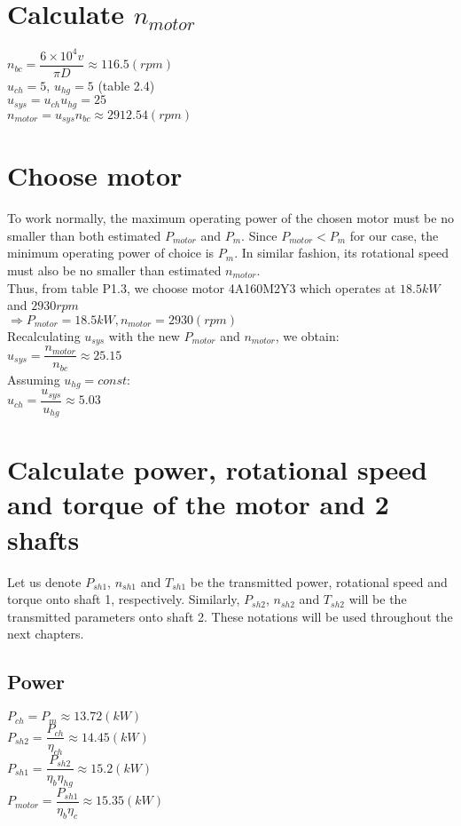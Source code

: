 \section{Calculate $ n_{motor} $}
$ n_{bc} = \dfrac{6\times10^4v}{\pi D} \approx 116.5 \unit{(rpm)}$\\
$ u_{ch} = 5$, $ u_{hg} = 5$ (table 2.4)\\
$ u_{sys} = u_{ch}u_{hg} = 25 $\\
$ n_{motor} = u_{sys}n_{bc} \approx 2912.54  \unit{(rpm)} $

\section{Choose motor}
To work normally, the maximum operating power of the chosen motor must be no smaller than both estimated $ P_{motor} $ and $ P_m $. Since $ P_{motor} < P_m $ for our case, the minimum operating power of choice is $ P_m $. In similar fashion, its rotational speed must also be no smaller than estimated $ n_{motor} $.\\
Thus, from table P1.3, we choose motor 4A160M2Y3 which operates at $ 18.5\unit{kW} $ and $ 2930\unit{rpm} $\\
$\Rightarrow P_{motor} = 18.5\unit{kW}, n_{motor} = 2930\unit{(rpm)}$\\
Recalculating $ u_{sys} $ with the new $ P_{motor} $ and $ n_{motor} $, we obtain:\\
$ u_{sys} = \dfrac{n_{motor}}{n_{bc}} \approx 25.15	$\\
Assuming $ u_{hg} = const $:\\
$ u_{ch} = \dfrac{u_{sys}}{u_{hg}} \approx 5.03$

\section{Calculate power, rotational speed and torque of the motor and 2 shafts}
Let us denote $ P_{sh1} $, $ n_{sh1} $ and $ T_{sh1} $ be the transmitted power, rotational speed and torque onto shaft 1, respectively. Similarly, $ P_{sh2} $, $ n_{sh2} $ and $ T_{sh2} $ will be the transmitted parameters onto shaft 2. These notations will be used throughout the next chapters.
\subsection{Power}
$ P_{ch} = P_m \approx 13.72 \unit{(kW)}$\\
$ P_{sh2} = \dfrac{P_{ch}}{\eta_{ch}} \approx 14.45 \unit{(kW)}$\\
$ P_{sh1} = \dfrac{P_{sh2}}{\eta_b\eta_{hg}} \approx 15.2 \unit{(kW)}$\\
$ P_{motor} = \dfrac{P_{sh1}}{\eta_b\eta_c} \approx 15.35 \unit{(kW)}$
